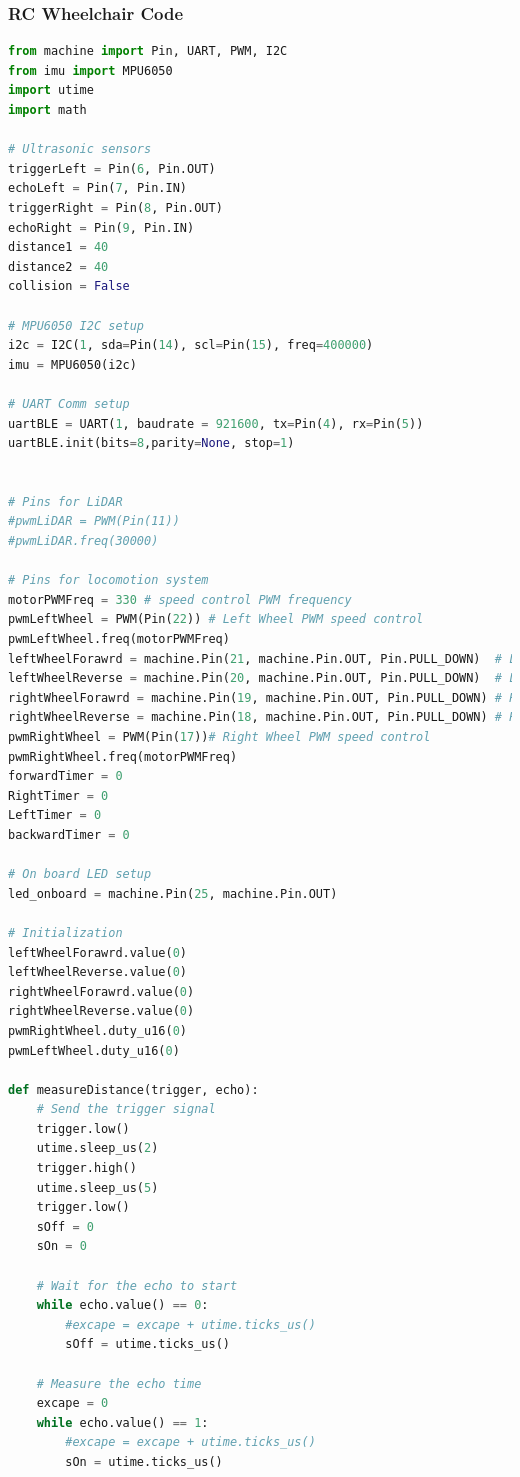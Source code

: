 \documentclass[conference]{IEEEtran}
\begin{document}
    \subsubsection{RC Wheelchair Code}
    \begin{lstlisting}[language=Python, caption=RC Wheelchair Code, label=rc_wheelchair_code]
    from machine import Pin, UART, PWM, I2C
from imu import MPU6050
import utime
import math

# Ultrasonic sensors
triggerLeft = Pin(6, Pin.OUT)
echoLeft = Pin(7, Pin.IN)
triggerRight = Pin(8, Pin.OUT)
echoRight = Pin(9, Pin.IN)
distance1 = 40
distance2 = 40
collision = False

# MPU6050 I2C setup
i2c = I2C(1, sda=Pin(14), scl=Pin(15), freq=400000)
imu = MPU6050(i2c)

# UART Comm setup
uartBLE = UART(1, baudrate = 921600, tx=Pin(4), rx=Pin(5))
uartBLE.init(bits=8,parity=None, stop=1)


# Pins for LiDAR
#pwmLiDAR = PWM(Pin(11))
#pwmLiDAR.freq(30000)

# Pins for locomotion system
motorPWMFreq = 330 # speed control PWM frequency
pwmLeftWheel = PWM(Pin(22)) # Left Wheel PWM speed control
pwmLeftWheel.freq(motorPWMFreq)
leftWheelForawrd = machine.Pin(21, machine.Pin.OUT, Pin.PULL_DOWN)  # Left wheel forward control
leftWheelReverse = machine.Pin(20, machine.Pin.OUT, Pin.PULL_DOWN)  # Left wheel reverse control
rightWheelForawrd = machine.Pin(19, machine.Pin.OUT, Pin.PULL_DOWN) # Right wheel forward control
rightWheelReverse = machine.Pin(18, machine.Pin.OUT, Pin.PULL_DOWN) # Right wheel reverse control
pwmRightWheel = PWM(Pin(17))# Right Wheel PWM speed control
pwmRightWheel.freq(motorPWMFreq)
forwardTimer = 0
RightTimer = 0
LeftTimer = 0
backwardTimer = 0

# On board LED setup
led_onboard = machine.Pin(25, machine.Pin.OUT)

# Initialization 
leftWheelForawrd.value(0)
leftWheelReverse.value(0)
rightWheelForawrd.value(0)
rightWheelReverse.value(0)
pwmRightWheel.duty_u16(0)
pwmLeftWheel.duty_u16(0)

def measureDistance(trigger, echo):
    # Send the trigger signal
    trigger.low()
    utime.sleep_us(2)
    trigger.high()
    utime.sleep_us(5)
    trigger.low()
    sOff = 0
    sOn = 0

    # Wait for the echo to start
    while echo.value() == 0:
        #excape = excape + utime.ticks_us()
        sOff = utime.ticks_us()
        
    # Measure the echo time
    excape = 0
    while echo.value() == 1:
        #excape = excape + utime.ticks_us()
        sOn = utime.ticks_us()
        

\end{lstlisting}
\end{document}
